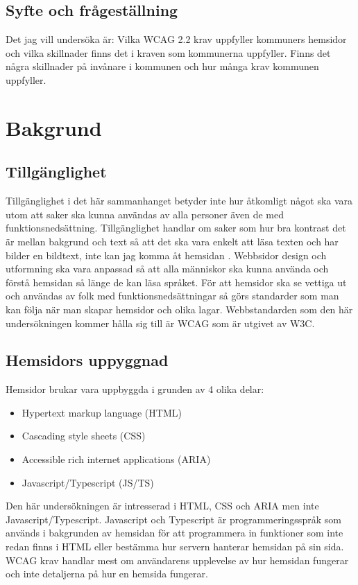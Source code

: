 \documentclass[11p]{article}
\begin{document}
    \subsection{Syfte och frågeställning}
    Det jag vill undersöka är:
    Vilka WCAG 2.2 krav uppfyller kommuners hemsidor och vilka skillnader finns det i kraven som kommunerna uppfyller.
    Finns det några skillnader på invånare i kommunen och hur många krav kommunen uppfyller.

    \section{Bakgrund}

    \subsection{Tillgänglighet}
    Tillgänglighet i det här sammanhanget betyder inte hur åtkomligt något ska vara utom att saker ska kunna användas av alla personer även de med funktionsnedsättning.
    Tillgänglighet handlar om saker som hur bra kontrast det är mellan bakgrund och text så att det ska vara enkelt att läsa texten och har bilder en bildtext, inte kan jag komma åt hemsidan \parencite{webbriktlinjer}.
    Webbsidor design och utformning ska vara anpassad så att alla människor ska kunna använda och förstå hemsidan så länge de kan läsa språket.
    För att hemsidor ska se vettiga ut och användas av folk med funktionsnedsättningar så görs standarder som man kan följa när man skapar hemsidor och olika lagar.
    Webbstandarden som den här undersökningen kommer hålla sig till är WCAG som är utgivet av W3C.


    \subsection{Hemsidors uppyggnad}
    Hemsidor brukar vara uppbyggda i grunden av 4 olika delar:
    \begin{itemize}
        \item Hypertext markup language (HTML)
        \item Cascading style sheets (CSS)
        \item Accessible rich internet applications (ARIA)
        \item Javascript/Typescript (JS/TS)
    \end{itemize}
    Den här undersökningen är intresserad i HTML, CSS och ARIA men inte Javascript/Typescript.
    Javascript och Typescript är programmeringsspråk som används i bakgrunden av hemsidan för att programmera in funktioner som inte redan finns i HTML eller bestämma hur servern hanterar hemsidan på sin sida.
    WCAG krav handlar mest om användarens upplevelse av hur hemsidan fungerar och inte detaljerna på hur en hemsida fungerar.
\end{document}
